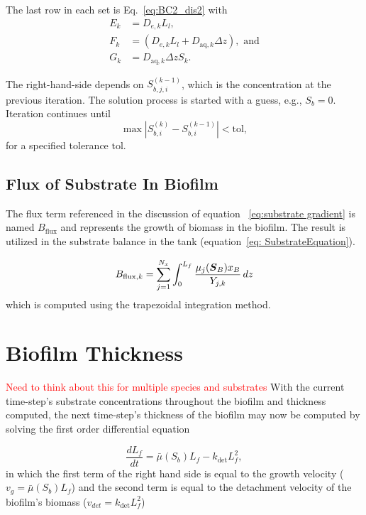 \documentclass[letterpaper, twoside]{article}
\numberwithin{equation}{section}
\def\bm#1{\mbox{\boldmath{$#1$}}}
\begin{document}
The last row in each set is Eq.~\ref{eq:BC2_dis2} with
\begin{align}
  E_k&=D_{e,k} L_l,\\
  F_k&=\left(D_{e,k} L_l + D_{\mathrm{aq},k} \Delta z\right),\text{ and}\\
  G_k&=D_{\mathrm{aq},k} \Delta z S_k.
\end{align}

The right-hand-side depends on $S_{b,j,i}^{(k-1)}$, which is the concentration at the previous iteration.  The solution process is started with a guess, e.g., $S_b=0$. Iteration continues until
\begin{equation*}
  \max\left| S_{b,i}^{(k)} - S_{b,i}^{(k-1)} \right| < \mathrm{tol},
\end{equation*}
for a specified tolerance $\mathrm{tol}$.

\subsection{Flux of Substrate In Biofilm}
The flux term referenced in the discussion of equation ~\ref{eq:substrate gradient} is named $B_\mathrm{flux}$ and represents the growth of biomass in the biofilm. The result is utilized in the substrate balance in the tank (equation~\ref{eq: SubstrateEquation}).

\begin{equation} \label{eq:Bflux}
  B_{\mathrm{flux},k} = \sum_{j=1}^{N_x} \int_0^{L_f} \frac{\mu_j(\bm{S}_B) x_B}{Y_{j,k}} \, dz %
\end{equation}
which is computed using the trapezoidal integration method. 

\section{Biofilm Thickness}\textcolor{red}{Need to think about this for multiple species and substrates}
With the current time-step's substrate concentrations throughout the biofilm and thickness computed, the next time-step's thickness of the biofilm may now be computed by solving the first order differential equation

\begin{equation}
  \label{eq:dLfdt_1}
  \frac{d L_f}{dt} = {\bar\mu(S_b) L_f}-{k_{\mathrm{det}}L_f^2},
\end{equation}
in which the first term of the right hand side is equal to the growth velocity ($v_g={\bar\mu(S_b) L_f}$) and the second term is equal to the detachment velocity of the biofilm's biomass ($v_{det}={k_{\mathrm{det}}L_f^2}$)
\end{document}
